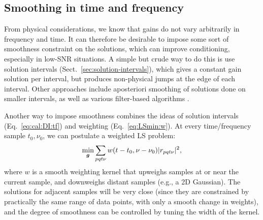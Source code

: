 \documentclass[useAMS,usenatbib]{mn2e}
\numberwithin{equation}{section} %
\begin{document}
\subsection{Smoothing in time and frequency}
\label{sec:DI:smooth}

From physical considerations, we know that gains do not vary arbitrarily in frequency and time. It can
therefore be desirable to impose some sort of smoothness constraint on the solutions, which can improve conditioning, especially
in low-SNR situations. A simple but crude way to do this is use solution intervals (Sect.~\ref{sec:solution-intervals}),
which gives a constant gain solution per interval, but produces non-physical jumps at the edge of each interval.
Other approaches include aposteriori smoothing of solutions done on smaller intervals, as well as various filter-based 
algorithms \citep{tasse-filters}. 

Another way to impose smoothness combines the ideas of solution intervals  (Eq.~\ref{eq:cal:DI:tf}) 
and weighting (Eq.~\ref{eq:LSmin:w}). At every time/frequency sample $t_0,\nu_0$, we can postulate a weighted 
LS problem:
\begin{equation}
\label{eq:cal:DI:smooth}
\min_{\bmath{g}}\sum_{pqt\nu}w(t-t_0,\nu-\nu_0)|r_{pqt\nu}|^2, 
\end{equation}
where $w$ is a smooth weighting kernel that upweighs samples at or near the current sample, and downweighs distant 
samples (e.g., a 2D Gaussian). The solutions for adjacent samples will be very close (since they 
are constrained by practically the same range of data points, with only a smooth change in weights), and the 
degree of smoothness can be controlled by tuning the width of the kernel.
\end{document}
